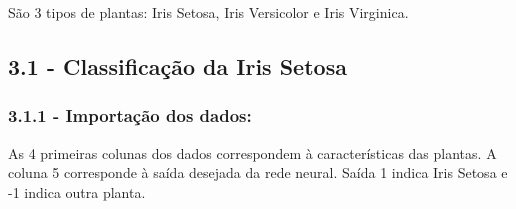 \documentclass[11pt]{article}
\begin{document}
São 3 tipos de plantas: Iris Setosa, Iris Versicolor e Iris Virginica.

\subsection{3.1 - Classificação da Iris
Setosa}\label{classificauxe7uxe3o-da-iris-setosa}

\subsubsection{3.1.1 - Importação dos
dados:}\label{importauxe7uxe3o-dos-dados}

As 4 primeiras colunas dos dados correspondem à características das
plantas. A coluna 5 corresponde à saída desejada da rede neural. Saída 1
indica Iris Setosa e -1 indica outra planta.
\end{document}
